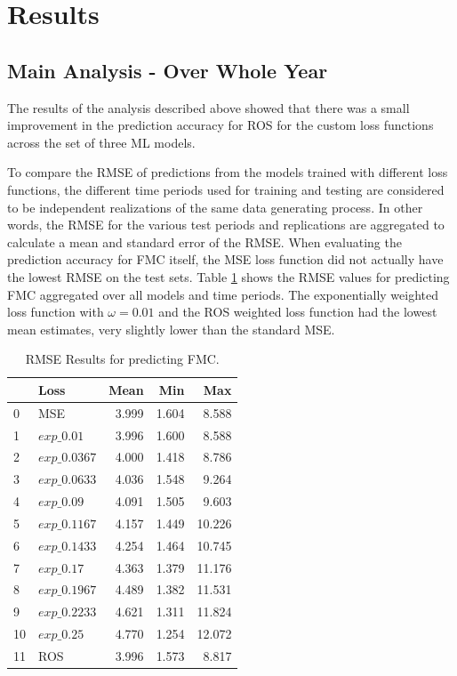 \documentclass[11pt]{article}%
\begin{document}
\section{Results}

\subsection{Main Analysis - Over Whole Year}

The results of the analysis described above showed that there was a small improvement in the prediction accuracy for ROS for the custom loss functions across the set of three ML models.

To compare the RMSE of predictions from the models trained with different loss functions, the different time periods used for training and testing are considered to be independent realizations of the same data generating process. In other words, the RMSE for the various test periods and replications are aggregated to calculate a mean and standard error of the RMSE. When evaluating the prediction accuracy for FMC itself, the MSE loss function did not actually have the lowest RMSE on the test sets. Table \ref{tab:fmc_results} shows the RMSE values for predicting FMC aggregated over all models and time periods. The exponentially weighted loss function with $\omega=0.01$ and the ROS weighted loss function had the lowest mean estimates, very slightly lower than the standard MSE. 

\begin{table}[ht]
\centering
\caption{RMSE Results for predicting FMC.}
\label{tab:fmc_results}
\begin{tabular}{llrrr}
\toprule
 & Loss & Mean & Min & Max \\
\midrule
0 & MSE & 3.999 & 1.604 & 8.588 \\
1 & $exp\_0.01$ & 3.996 & 1.600 & 8.588 \\
2 & $exp\_0.0367$ & 4.000 & 1.418 & 8.786 \\
3 & $exp\_0.0633$ & 4.036 & 1.548 & 9.264 \\
4 & $exp\_0.09$ & 4.091 & 1.505 & 9.603 \\
5 & $exp\_0.1167$ & 4.157 & 1.449 & 10.226 \\
6 & $exp\_0.1433$ & 4.254 & 1.464 & 10.745 \\
7 & $exp\_0.17$ & 4.363 & 1.379 & 11.176 \\
8 & $exp\_0.1967$ & 4.489 & 1.382 & 11.531 \\
9 & $exp\_0.2233$ & 4.621 & 1.311 & 11.824 \\
10 & $exp\_0.25$ & 4.770 & 1.254 & 12.072 \\
11 & ROS & 3.996 & 1.573 & 8.817 \\
\bottomrule
\end{tabular}
\end{table}
\end{document}
